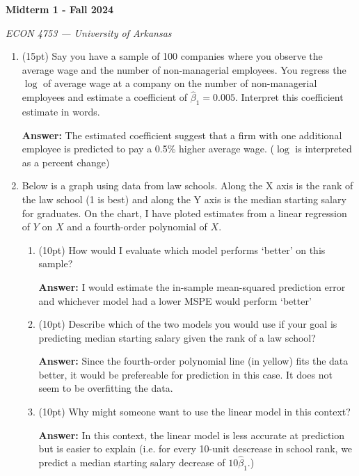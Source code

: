 \documentclass[12pt]{article}
\newcommand{\answer}[1]{{\color{blue_winged_teal}\textbf{Answer:} #1}}
\newcommand{\pts}[1]{{\color{zinc500}#1}}
\begin{document}
\begin{center}
  {\Huge\bf Midterm 1 - Fall 2024}
  
  \smallskip
  {\large\it ECON 4753 — University of Arkansas}
\end{center}

\vspace{5mm}
\begin{enumerate}
  \item \pts{(15pt)} Say you have a sample of 100 companies where you observe the average wage and the number of non-managerial employees. You regress the $\log$ of average wage at a company on the number of non-managerial employees and estimate a coefficient of $\hat{\beta}_1 = 0.005$. Interpret this coefficient estimate in words.
  
  \answer{The estimated coefficient suggest that a firm with one additional employee is predicted to pay a 0.5\% higher average wage. ($\log$ is interpreted as a percent change)}



  \vspace{5mm}
  \item Below is a graph using data from law schools. Along the X axis is the rank of the law school (1 is best) and along the Y axis is the median starting salary for graduates. On the chart, I have ploted estimates from a linear regression of $Y$ on $X$ and a fourth-order polynomial of $X$.
  \begin{enumerate}
    \item \pts{(10pt)} How would I evaluate which model performs `better' on this sample?
    
    \answer{I would estimate the in-sample mean-squared prediction error and whichever model had a lower MSPE would perform `better'}

    \item \pts{(10pt)} Describe which of the two models you would use if your goal is predicting median starting salary given the rank of a law school? 
    
    \answer{Since the fourth-order polynomial line (in yellow) fits the data better, it would be prefereable for prediction in this case. It does not seem to be overfitting the data.}

    \item \pts{(10pt)} Why might someone want to use the linear model in this context?
    
    \answer{In this context, the linear model is less accurate at prediction but is easier to explain (i.e. for every 10-unit descrease in school rank, we predict a median starting salary decrease of $10 \hat{\beta}_1$.)}
  \end{enumerate}


\end{enumerate}
\end{document}
